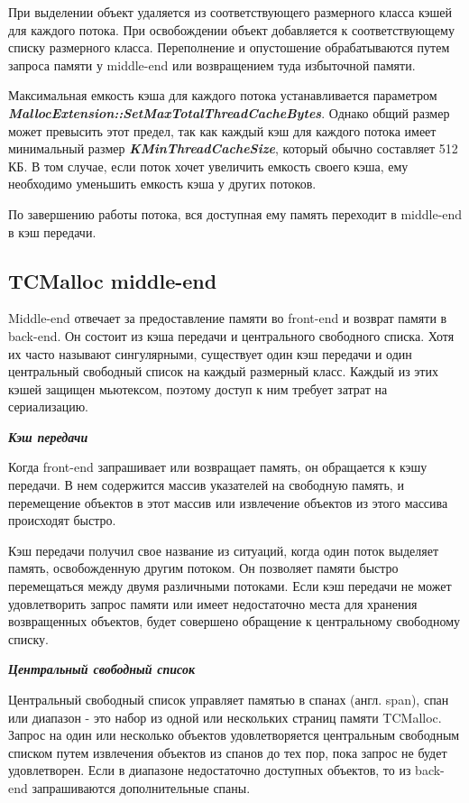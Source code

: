 При выделении объект удаляется из соответствующего размерного класса кэшей для каждого потока. При освобождении объект добавляется к соответствующему списку размерного класса. Переполнение и опустошение обрабатываются путем запроса памяти у middle-end  или возвращением туда избыточной памяти.

Максимальная емкость кэша для каждого потока устанавливается параметром \textbf{\textit{MallocExtension::SetMaxTotalThreadCacheBytes}}. Однако общий размер может превысить этот предел, так как каждый кэш для каждого потока имеет минимальный размер \textbf{\textit{KMinThreadCacheSize}}, который обычно составляет 512 КБ. В том случае, если поток хочет увеличить емкость своего кэша, ему необходимо уменьшить емкость кэша у других потоков.

По завершению работы потока, вся доступная ему память переходит в middle-end в кэш передачи.

\subsection{TCMalloc middle-end}
Middle-end отвечает за предоставление памяти во front-end и возврат памяти в back-end. Он состоит из кэша передачи и центрального свободного списка. Хотя их часто называют сингулярными, существует один кэш передачи и один центральный свободный список на каждый размерный класс. Каждый из этих кэшей защищен мьютексом, поэтому доступ к ним требует затрат на сериализацию.

\bigbreak
\textit{\textbf{Кэш передачи}}

Когда front-end запрашивает или возвращает память, он обращается к кэшу передачи. В нем содержится массив указателей на свободную память, и перемещение объектов в этот массив или извлечение объектов из этого массива происходят быстро.

Кэш передачи получил свое название из ситуаций, когда один поток выделяет память, освобожденную другим потоком. Он позволяет памяти быстро перемещаться между двумя различными потоками. Если кэш передачи не может удовлетворить запрос памяти или имеет недостаточно места для хранения возвращенных объектов, будет совершено обращение к центральному свободному списку.

\bigbreak
\textit{\textbf{Центральный свободный список}}

Центральный свободный список управляет памятью в спанах (англ. span), спан или диапазон - это набор из одной или нескольких страниц памяти TCMalloc. Запрос на один или несколько объектов удовлетворяется центральным свободным списком путем извлечения объектов из спанов до тех пор, пока запрос не будет удовлетворен. Если в диапазоне недостаточно доступных объектов, то из back-end запрашиваются дополнительные спаны.

